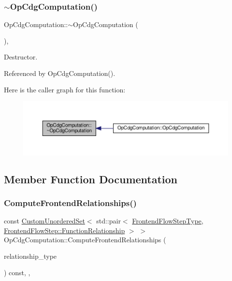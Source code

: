 \subsubsection{\texorpdfstring{$\sim$\+Op\+Cdg\+Computation()}{~OpCdgComputation()}}
{\footnotesize\ttfamily Op\+Cdg\+Computation\+::$\sim$\+Op\+Cdg\+Computation (\begin{DoxyParamCaption}{ }\end{DoxyParamCaption})\hspace{0.3cm}{\ttfamily [override]}, {\ttfamily [default]}}



Destructor. 



Referenced by Op\+Cdg\+Computation().

Here is the caller graph for this function\+:
\nopagebreak
\begin{figure}[H]
\begin{center}
\leavevmode
\includegraphics[width=350pt]{df/deb/classOpCdgComputation_a045d9c0d3940b48a1a888a8e839d5683_icgraph}
\end{center}
\end{figure}


\subsection{Member Function Documentation}
\mbox{\label{classOpCdgComputation_a73ae2a7476108bdceae7b11d488fad81}} 
\subsubsection{\texorpdfstring{Compute\+Frontend\+Relationships()}{ComputeFrontendRelationships()}}
{\footnotesize\ttfamily const \hyperlink{classCustomUnorderedSet}{Custom\+Unordered\+Set}$<$ std\+::pair$<$ \hyperlink{frontend__flow__step_8hpp_afeb3716c693d2b2e4ed3e6d04c3b63bb}{Frontend\+Flow\+Step\+Type}, \hyperlink{classFrontendFlowStep_af7cf30f2023e5b99e637dc2058289ab0}{Frontend\+Flow\+Step\+::\+Function\+Relationship} $>$ $>$ Op\+Cdg\+Computation\+::\+Compute\+Frontend\+Relationships (\begin{DoxyParamCaption}\item[{const \hyperlink{classDesignFlowStep_a723a3baf19ff2ceb77bc13e099d0b1b7}{Design\+Flow\+Step\+::\+Relationship\+Type}}]{relationship\+\_\+type }\end{DoxyParamCaption}) const\hspace{0.3cm}{\ttfamily [override]}, {\ttfamily [private]}, {\ttfamily [virtual]}}



